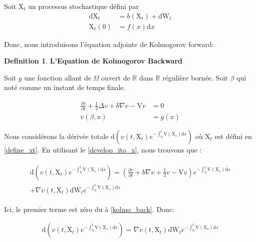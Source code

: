 \documentclass[11pt]{article}
\theoremstyle{definition}
\newtheorem{definition}{Definition}[section]
\theoremstyle{remark}
\begin{document}
Soit $\mathrm{X}_{t}$ un processus stochastique défini par  
\begin{equation}
\label{define_xt}
\begin{split}
\mathrm{dX}_{t} &= b(\mathrm{X}_{t}) + \mathrm{dW}_{t}\\
\mathrm{X}_{t}(0) &= f(x)\mathrm{d}x
\end{split}
\end{equation}

Donc, nous introduisons l'équation adjointe de Kolmogorov forward:

\begin{definition}{\textbf{L'Equation de Kolmogorov Backward}}

Soit $g$ une fonction allant de $\Omega$ ouvert de $\mathbb{R}$ dans $\mathbb{R}$ régulière bornée. Soit $\beta$ qui noté comme un instant de temps finale. 

\begin{equation}
\label{kolmo_back}
\begin{split}
\frac{\partial v}{\partial t} + \frac{1}{2} \Delta v + b \nabla v - \mathrm{V}v &= 0 \\
v(\beta, x) &= g(x)
\end{split}
\end{equation}
\end{definition}

Nous considérons la dérivée totale $\mathrm{d}(v(t, \mathrm{X}_{t}) e^{-\int_0^{t} \mathrm{V}(\mathrm{X}_{s}) \mathrm{d}s})$ où $\mathrm{X}_{t}$ est défini en \ref{define_xt}. En utilisant le \ref{develop_ito_x}, nous trouvons que :

\begin{multline}
\begin{split}
\mathrm{d}(v(t, \mathrm{X}_{t}) e^{-\int_0^{t} \mathrm{V}(\mathrm{X}_{s}) \mathrm{d}s}) = (\frac{\partial v}{\partial t} + b \nabla v + \frac{1}{2}v - \mathrm{V}v)e^{-\int_0^{t} \mathrm{V}(\mathrm{X}_{s}) \mathrm{d}s} \\
+ \nabla v(t, \mathrm{X}_t)\mathrm{dW}_{t} e^{-\int_0^{t} \mathrm{V}(\mathrm{X}_{s}) \mathrm{d}s}
\end{split}
\end{multline}

Ici, le premier terme est zéro du à \ref{kolmo_back}. Donc:

\begin{align}
\mathrm{d}(v(t, \mathrm{X}_{t}) e^{-\int_0^{t} \mathrm{V}(\mathrm{X}_{s}) \mathrm{d}s}) = \nabla v(t, \mathrm{X}_t)\mathrm{dW}_{t} e^{-\int_0^{t} \mathrm{V}(\mathrm{X}_{s}) \mathrm{d}s}
\end{align}
\end{document}
